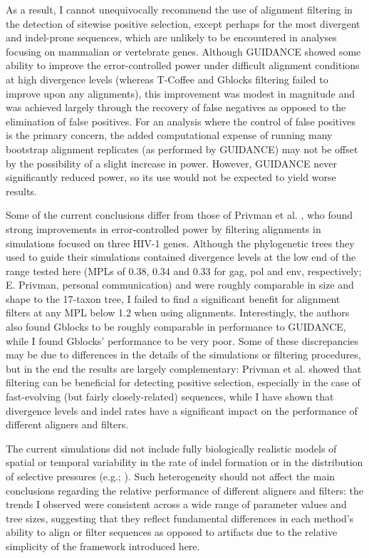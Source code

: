 As a result, I cannot unequivocally recommend the use of alignment
filtering in the detection of sitewise positive selection, except
perhaps for the most divergent and indel-prone sequences, which are
unlikely to be encountered in analyses focusing on mammalian or
vertebrate genes. Although GUIDANCE showed some ability to improve the
error-controlled power under difficult alignment conditions at high
divergence levels (whereas T-Coffee and Gblocks filtering failed to improve upon
any \prankc alignments), this improvement was modest in magnitude and
was achieved largely through the recovery of false negatives as
opposed to the elimination of false positives. For an analysis where
the control of false positives is the primary concern, the added
computational expense of running many bootstrap alignment replicates
(as performed by GUIDANCE) may not be offset by the possibility of a
slight increase in power. However, GUIDANCE never significantly
reduced power, so its use would not be expected to yield worse
results.

Some of the current  conclusions differ from those of Privman et
al. \citeyearpar{Privman2011Improving}, who found strong improvements
in error-controlled power by filtering alignments in simulations
focused on three HIV-1 genes. Although the phylogenetic trees they
used to guide their simulations contained divergence levels at the low
end of the  range tested here (MPLs of 0.38, 0.34 and 0.33 for gag, pol and
env, respectively; E. Privman, personal communication) and were
roughly comparable in size and shape to the 17-taxon tree, I failed
to find a significant benefit for alignment filters at any MPL below
1.2 when using \prankc alignments. Interestingly, the authors also
found Gblocks to be roughly comparable in performance to GUIDANCE,
while I found Gblocks' performance to be very poor. Some of these
discrepancies may be due to differences in the details of the
simulations or filtering procedures, but in the end the results are
largely complementary: Privman et al. showed that filtering can be
beneficial for detecting positive selection, especially in the case of
fast-evolving (but fairly closely-related) sequences, while I have
shown that divergence levels and indel rates have a significant impact
on the performance of different aligners and filters.

The current simulations did not include fully biologically realistic
models of spatial or temporal variability in the rate of indel
formation or in the distribution of selective pressures (e.g.;
\citealt{Whelan2008}).  Such heterogeneity should not affect the main
conclusions regarding the relative performance of different aligners
and filters: the trends I observed were consistent across a wide range
of parameter values and tree sizes, suggesting that they reflect
fundamental differences in each method's ability to align or filter
sequences as opposed to artifacts due to the relative simplicity of
the framework introduced here.

